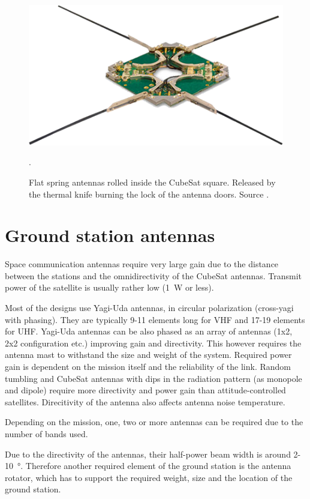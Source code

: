 \begin{figure}[H]
    \centering
    \includegraphics[width=0.5\paperwidth]{img/2/isis_dipole.png}
    \caption{Flat spring antennas rolled inside the CubeSat square. Released by the thermal knife burning the lock of the antenna doors. Source \cite{isis_dipole_antenna}.}.
    \label{isis_dipole_antenna}
\end{figure}

\section{Ground station antennas}
Space communication antennas require very large gain due to the distance between the stations and the omnidirectivity of the CubeSat antennas. Transmit power of the satellite is usually rather low (\SI{1}{\watt} or less).

Most of the designs use Yagi-Uda antennas, in circular polarization (cross-yagi with phasing). They are typically 9-11 elements long for VHF and 17-19 elements for UHF. Yagi-Uda antennas can be also phased as an array of antennas (1x2, 2x2 configuration etc.) improving gain and directivity. This however requires the antenna mast to withstand the size and weight of the system. Required power gain is dependent on the mission itself and the reliability of the link. Random tumbling and CubeSat antennas with dips in the radiation pattern (as monopole and dipole) require more directivity and power gain than attitude-controlled satellites. Direcitivity of the antenna also affects antenna noise temperature.

Depending on the mission, one, two or more antennas can be required due to the number of bands used. 

Due to the directivity of the antennas, their half-power beam width is around \si{2}-\SI{10}{\degree}. Therefore another required element of the ground station is the antenna rotator, which has to support the required weight, size and the location of the ground station.


